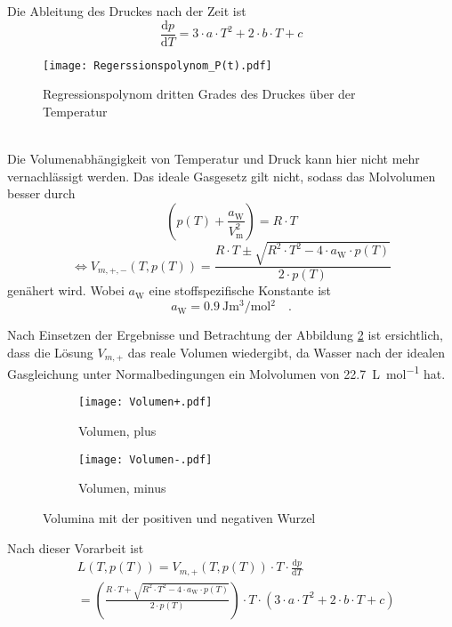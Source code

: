 Die Ableitung des Druckes nach der Zeit ist
\begin{equation}
\frac{\text{d} p}{\text{d} T} = 3 \cdot a \cdot T^2 + 2 \cdot b \cdot T + c
\end{equation}
\begin{figure}[h!]
	\centering
	\texttt{[image: Regerssionspolynom\_P(t).pdf]}
	\caption{Regressionspolynom dritten Grades des Druckes über der Temperatur}
	\label{fig:Regerssionspolynom_P(t)}
\end{figure}
\\

Die Volumenabhängigkeit von Temperatur und Druck kann hier nicht mehr vernachlässigt werden. Das ideale Gasgesetz gilt nicht, sodass das Molvolumen besser durch
\begin{equation}
\left( p(T) + \frac{a_\text{W}}{V_\text{m}^2}\right) = R \cdot T
\end{equation}
\begin{equation}
\Leftrightarrow
V_{m,+,-}(T, p(T)) = \frac{R \cdot T \pm \sqrt{R^2 \cdot T^2 - 4 \cdot a_\text{W} \cdot p(T)}}{2 \cdot p(T)}
\end{equation}
genähert wird. Wobei $a_\text{W}$ eine stoffspezifische Konstante ist
\begin{equation}
a_\text{W} = \SI{0.9}{\joule\metre^3\per\mol^2} \quad.
\end{equation}

 Nach Einsetzen der Ergebnisse und Betrachtung der Abbildung \ref{fig:volumen} ist ersichtlich, dass die Lösung $V_{m,+}$ das reale Volumen wiedergibt, da Wasser nach der idealen Gasgleichung unter Normalbedingungen ein Molvolumen von \SI{22.7}{\liter\per\mol} hat.
\begin{figure} 
	\centering
	\begin{subfigure}{\textwidth}
		\centering
		\texttt{[image: Volumen+.pdf]}
		\caption{Volumen, plus}
	\end{subfigure}
	\begin{subfigure}{\textwidth}
		\centering
		\texttt{[image: Volumen-.pdf]}
		\caption{Volumen, minus}
	\end{subfigure}
	\caption{Volumina mit der positiven und negativen Wurzel }
	\label{fig:volumen}
\end{figure}


Nach dieser Vorarbeit ist
\begin{align}
& L(T, p(T)) = V_{m,+}(T, p(T)) \cdot T \cdot \frac{\text{d} p}{\text{d} T} \\
&= \left(\frac{R \cdot T + \sqrt{R^2 \cdot T^2 - 4 \cdot a_\text{W} \cdot p(T)}}{2 \cdot p(T)}\right)  \cdot T \cdot \left(3 \cdot a \cdot T^2 + 2 \cdot b \cdot T + c \right) %
\end{align}

